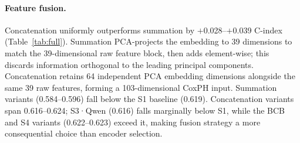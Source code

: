 \paragraph{Feature fusion.}
Concatenation uniformly outperforms summation by $+$0.028--$+$0.039
C-index (Table~\ref{tab:full}).
Summation PCA-projects the embedding to 39 dimensions to match the
39-dimensional raw feature block, then adds element-wise; this discards
information orthogonal to the leading principal components.
Concatenation retains 64 independent PCA embedding dimensions alongside
the same 39 raw features, forming a 103-dimensional CoxPH input.
Summation variants (0.584--0.596) fall below the S1 baseline (0.619).
Concatenation variants span 0.616--0.624; S3·Qwen (0.616) falls marginally
below S1, while the BCB and S4 variants (0.622--0.623) exceed it, making
fusion strategy a more consequential choice than encoder selection.

